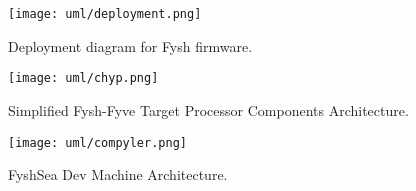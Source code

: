 \begin{figure}[h]
	\centering
	\texttt{[image: uml/deployment.png]}
	\caption{Deployment diagram for Fysh firmware.}
	\label{fig:deployment}
\end{figure}

\begin{figure}[h]
	\centering
	\texttt{[image: uml/chyp.png]}
	\caption{Simplified Fysh-Fyve Target Processor Components Architecture.}
	\label{fig:component}
\end{figure}

\begin{figure}[h]
	\centering
	\texttt{[image: uml/compyler.png]}
	\caption{FyshSea Dev Machine Architecture.}
	\label{fig:component}
\end{figure}


